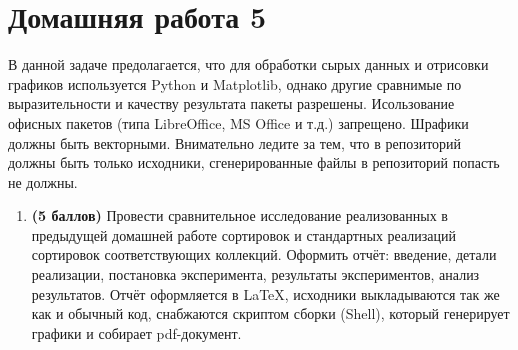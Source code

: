 \section{Домашняя работа 5}

В данной задаче предолагается, что для обработки сырых данных и отрисовки графиков используется Python и Matplotlib, однако другие сравнимые по выразительности и качеству результата пакеты разрешены. Исользование офисных пакетов (типа LibreOffice, MS Office и т.д.) запрещено. Шрафики должны быть векторными. Внимательно ледите за тем, что в репозиторий должны быть только исходники, сгенерированные файлы в репозиторий попасть не должны.

\begin{enumerate}
    \item \textbf{(5 баллов)} Провести сравнительное исследование реализованных в предыдущей домашней работе сортировок и стандартных реализаций сортировок соответствующих коллекций. Оформить отчёт: введение, детали реализации, постановка эксперимента, результаты экспериментов, анализ результатов. Отчёт оформляется в \LaTeX, исходники выкладываются так же как и обычный код, снабжаются скриптом сборки (Shell), который генерирует графики и собирает pdf-документ.
\end{enumerate}

